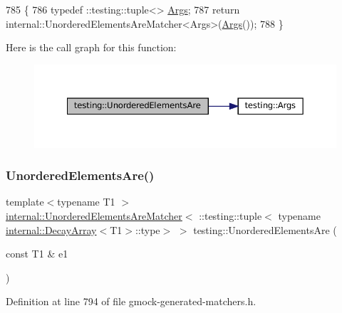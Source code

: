 \begin{DoxyCode}
785                        \{
786   typedef ::testing::tuple<> \hyperlink{namespacetesting_a09ac462e8d6ed468cbfaa9c767aee0aa}{Args};
787   \textcolor{keywordflow}{return} internal::UnorderedElementsAreMatcher<Args>(\hyperlink{namespacetesting_a09ac462e8d6ed468cbfaa9c767aee0aa}{Args}());
788 \}
\end{DoxyCode}
Here is the call graph for this function\+:
\nopagebreak
\begin{figure}[H]
\begin{center}
\leavevmode
\includegraphics[width=350pt]{namespacetesting_a8622c12aadfa0e60f7d68683eeb21115_cgraph}
\end{center}
\end{figure}
\mbox{\label{namespacetesting_a0b81dd5584a3588cc2516b29ef166b7d}} 
\subsubsection{\texorpdfstring{Unordered\+Elements\+Are()}{UnorderedElementsAre()}\hspace{0.1cm}{\footnotesize\ttfamily [2/11]}}
{\footnotesize\ttfamily template$<$typename T1 $>$ \\
\hyperlink{classtesting_1_1internal_1_1UnorderedElementsAreMatcher}{internal\+::\+Unordered\+Elements\+Are\+Matcher}$<$ \+::testing\+::tuple$<$ typename \hyperlink{structtesting_1_1internal_1_1DecayArray}{internal\+::\+Decay\+Array}$<$T1$>$\+::type$>$ $>$ testing\+::\+Unordered\+Elements\+Are (\begin{DoxyParamCaption}\item[{const T1 \&}]{e1 }\end{DoxyParamCaption})\hspace{0.3cm}{\ttfamily [inline]}}



Definition at line 794 of file gmock-\/generated-\/matchers.\+h.



